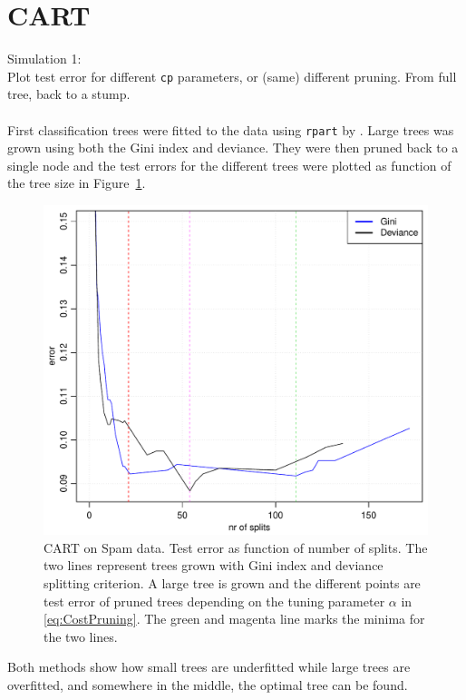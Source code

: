 \section{CART}
\label{sec:CARTsim}
Simulation 1: \\
Plot test error for different \verb+cp+ parameters, or (same) different pruning. From full tree, back to a stump.\\
\\
First classification trees were fitted to the data using \verb+rpart+ by \cite{rpart}. Large trees was grown using both the Gini index and deviance. They were then pruned back to a single node and the test errors for the different trees were plotted as function of the tree size in Figure~\ref{fig:cartCPSpam}. 
%
\begin{figure}[h!tp]
\begin{center}
    \includegraphics[scale=0.5]{./figures/cartCPSpam.pdf}
\end{center}
\caption{CART on Spam data. Test error as function of number of splits. The two lines represent trees grown with Gini index and deviance splitting criterion. A large tree is grown and the different points are test error of pruned trees depending on the tuning parameter $\alpha$ in \eqref{eq:CostPruning}. The green and magenta line marks the minima for the two lines. }
\label{fig:cartCPSpam}
\end{figure}
%
Both methods show how small trees are underfitted while large trees are overfitted, and somewhere in the middle, the optimal tree can be found. 

